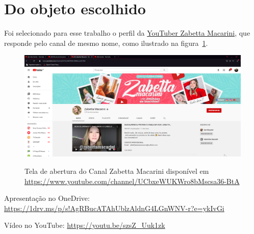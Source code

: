 \section{Do objeto escolhido}

Foi selecionado para esse trabalho o perfil da \href{https://www.youtube.com/channel/UCbxeWUKWro8bMscsa36-BtA}{YouTuber Zabetta Macarini}, que responde pelo canal  de mesmo nome, como ilustrado na figura~\ref{fig:canal-zabetta-macarini}.


\begin{figure}[h!]
    \centering
    \href{https://www.youtube.com/channel/UCbxeWUKWro8bMscsa36-BtA}{
        \includegraphics[width=0.999\linewidth]{fig/Canal-Zabetta-Macarini}
    }
    \caption{Tela de abertura do Canal Zabetta Macarini disponível em \url{https://www.youtube.com/channel/UCbxeWUKWro8bMscsa36-BtA}}
    \label{fig:canal-zabetta-macarini}
\end{figure}




Apresentação no OneDrive: \url{https://1drv.ms/p/s!AgRBucATAhUblzAldnG4LGnWNV-r?e=ykIvGi} \\
\begin{center}
    \href{https://1drv.ms/p/s!AgRBucATAhUblzAldnG4LGnWNV-r?e=ykIvGi}{
    }
\end{center}


Vídeo no YouTube: \url{https://youtu.be/szsZ_Uuk1zk} \\
\begin{center}
    \href{https://youtu.be/szsZ_Uuk1zk}{
    }
\end{center}
